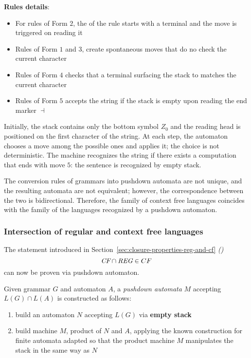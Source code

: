 \documentclass[english]{article}
\begin{document}
\bigskip
\textbf{Rules details}:

\begin{itemize}
  \item For rules of Form \(2\), the \RP of the rule starts with a terminal and the move is triggered on reading it
  \item Rules of Form \(1\) and \(3\), create spontaneous moves that do no check the current character
  \item Rules of Form \(4\) checks that a terminal surfacing the stack to matches the current character
  \item Rules of Form \(5\) accepts the string if the stack is empty upon reading the end marker \(\dashv\)
\end{itemize}

Initially, the stack contains only the bottom symbol \(Z_0\) and the reading head is positioned on the first character of the string.
At each step, the automaton chooses a move among the possible ones and applies it; the choice is not deterministic.
The machine recognizes the string if there exists a computation that ends with move \(5\): the sentence is recognized by empty stack.

The conversion rules of grammars into pushdown automata are not unique, and the resulting automata are not equivalent;
however, the correspondence between the two is bidirectional.
Therefore, the family of context free languages \CF coincides with the family of the languages recognized by a pushdown automaton.

\subsubsection{Intersection of regular and context free languages}
\label{sec:intersection-of-regular-and-context-free-languages}

The statement introduced in Section~\ref{sec:closure-properties-reg-and-cf} \textit{()}
\[ \textit{CF} \cap \textit{REG} \in CF \]
can now be proven via pushdown automaton.

Given grammar \(G\) and automaton \(A\), a \textit{pushdown automata} \(M\) accepting \(L(G) \cap L(A)\) is constructed as follows:

\begin{enumerate}
  \item build an automaton \(N\) accepting \(L(G)\) via \textbf{empty stack}
  \item build machine \(M\), product of \(N\) and \(A\), applying the known construction for finite automata adapted so that the product machine \(M\) manipulates the stack in the same way as \(N\)
\end{enumerate}
\end{document}
